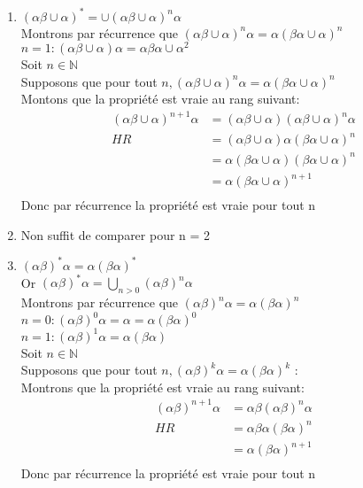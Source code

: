\documentclass[12pt]{report}
\newcommand{\N}{\mathbb{N}}
\begin{document}
\begin{enumerate}
    \item $(\alpha \beta \cup \alpha)^* = \cup (\alpha \beta \cup \alpha)^n \alpha$\\
    Montrons par récurrence que $(\alpha \beta \cup \alpha)^n \alpha = \alpha (\beta \alpha \cup \alpha)^n$\\
    $n = 1 : (\alpha \beta \cup \alpha)\alpha = \alpha \beta \alpha \cup \alpha^2$\\
    Soit $n \in \N$\\
    Supposons que pour tout $n,(\alpha \beta \cup \alpha)^n \alpha = \alpha (\beta \alpha \cup \alpha)^n$\\
    Montons que la propriété est vraie au rang suivant:\\
    \begin{align*}
        (\alpha \beta \cup \alpha)^{n+1}\alpha &= (\alpha \beta \cup \alpha)(\alpha \beta \cup \alpha)^n\alpha\\
        HR &= (\alpha \beta \cup \alpha)\alpha (\beta \alpha \cup \alpha)^n\\
        & = \alpha ( \beta \alpha \cup \alpha)(\beta \alpha \cup \alpha)^n\\
        & = \alpha ( \beta \alpha \cup \alpha)^{n+1}\\
    \end{align*}
    Donc par récurrence la propriété est vraie pour tout n
    \item Non suffit de comparer pour n = 2
    \item $(\alpha \beta)^* \alpha = \alpha(\beta \alpha)^*$\\
    Or $(\alpha \beta)^*\alpha = \bigcup_{n > 0} (\alpha \beta)^n \alpha$\\
    Montrons par récurrence que $(\alpha \beta)^n \alpha = \alpha (\beta \alpha)^n$\\
    $n=0 : (\alpha \beta)^0\alpha = \alpha = \alpha(\beta \alpha)^0$\\
    $n=1 : (\alpha \beta)^1\alpha = \alpha(\beta \alpha)$\\
    Soit $n \in \N$\\
    Supposons que pour tout $n, (\alpha \beta)^k \alpha = \alpha (\beta \alpha)^k$ :\\
    Montrons que la propriété est vraie au rang suivant:\\
    \begin{align*}
        (\alpha \beta)^{n+1}\alpha &= \alpha \beta (\alpha \beta)^n \alpha\\
        HR &= \alpha \beta \alpha (\beta \alpha)^n\\
        &= \alpha (\beta \alpha)^{n+1}\\
    \end{align*}
    Donc par récurrence la propriété est vraie pour tout n
    
\end{enumerate}
\end{document}
